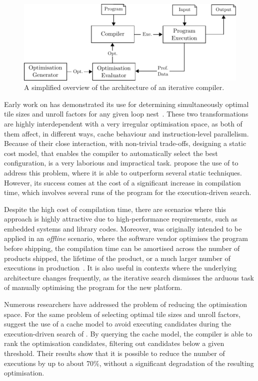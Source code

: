 \begin{figure}[htb]
    \centering
    \includegraphics[width=0.8\linewidth]{src/background/figs/itercomp-diagram}
    \caption{A simplified overview of the architecture of an iterative compiler.}
    \label{fig:itercomp-diagram}
\end{figure}

Early work on {\itercomp} has demonstrated its use for determining simultaneously optimal tile sizes and unroll factors for any given loop nest~\cite{kisuki00,knijnenburg04}.
These two transformations are highly interdependent with a very irregular optimisation space, as both of them affect, in different ways, cache behaviour and instruction-level parallelism.
Because of their close interaction, with non-trivial trade-offs, designing a static cost model, that enables the compiler to automatically select the best configuration, is a very laborious and impractical task.
\cite{kisuki00} propose the use of {\itercomp} to address this problem, where it is able to outperform several static techniques.
However, its success comes at the cost of a significant increase in compilation time, which involves several runs of the program for the execution-driven search.

Despite the high cost of compilation time, there are scenarios where this approach is highly attractive due to high-performance requirements, such as embedded systems and library codes.
Moreover, {\itercomp} was originally intended to be applied in an \textit{offline} scenario, where the software vendor optimises the program before shipping, the compilation time can be amortised across the number of products shipped, the lifetime of the product, or a much larger number of executions in production~\cite{kisuki99,kisuki00,chen10}.
It is also useful in contexts where the underlying architecture changes frequently, as the iterative search dismisses the arduous task of manually optimising the program for the new platform.

Numerous researchers have addressed the problem of reducing the optimisation space.
For the same problem of selecting optimal tile sizes and unroll factors, \cite{knijnenburg04} suggest the use of a cache model to avoid executing candidates during the execution-driven search of {\itercomp}.
By querying the cache model, the compiler is able to rank the optimisation candidates, filtering out candidates below a given threshold.
Their results show that it is possible to reduce the number of executions by up to about 70\%, without a significant degradation of the resulting optimisation.

